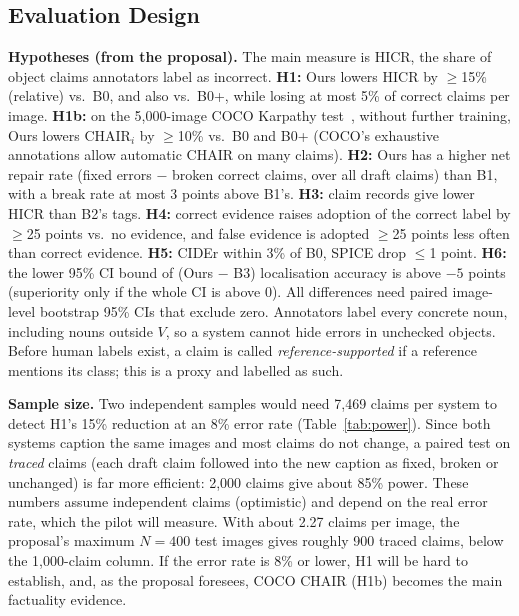 \documentclass[conference]{IEEEtran}
\begin{document}
\subsection{Evaluation Design}
\label{sec:eval}
\textbf{Hypotheses (from the proposal).} The main measure is HICR, the share of object claims annotators label
as incorrect. \textbf{H1:} Ours lowers HICR by $\ge$15\% (relative) vs.\ B0, and also vs.\ B0+, while losing at
most 5\% of correct claims per image. \textbf{H1b:} on the 5,000-image COCO Karpathy
test~\cite{karpathy2015deep,lin2014microsoft}, without further training, Ours lowers CHAIR$_i$
\cite{rohrbach2018object} by $\ge$10\% vs.\ B0 and B0+ (COCO's exhaustive annotations allow automatic CHAIR on
many claims). \textbf{H2:} Ours has a higher net repair rate (fixed errors $-$ broken correct claims, over all
draft claims) than B1, with a break rate at most 3 points above B1's. \textbf{H3:} claim records give lower
HICR than B2's tags. \textbf{H4:} correct evidence raises adoption of the correct label by $\ge$25 points vs.\
no evidence, and false evidence is adopted $\ge$25 points less often than correct evidence. \textbf{H5:} CIDEr
within 3\% of B0, SPICE drop $\le$1 point. \textbf{H6:} the lower 95\% CI bound of (Ours $-$ B3) localisation
accuracy is above $-5$ points (superiority only if the whole CI is above 0). All differences need paired
image-level bootstrap 95\% CIs that exclude zero. Annotators label every concrete noun, including nouns outside
$V$, so a system cannot hide errors in unchecked objects. Before human labels exist, a claim is called
\emph{reference-supported} if a reference mentions its class; this is a proxy and labelled as such.

\textbf{Sample size.} Two independent samples would need 7,469 claims per system to detect H1's 15\%
reduction at an 8\% error rate (Table~\ref{tab:power}). Since both systems caption the same images and most
claims do not change, a paired test on \emph{traced} claims (each draft claim followed into the new caption as
fixed, broken or unchanged) is far more efficient: 2,000 claims give about 85\% power. These numbers assume
independent claims (optimistic) and depend on the real error rate, which the pilot will measure. With about
2.27 claims per image, the proposal's maximum $N=400$ test images gives roughly 900 traced claims, below the
1,000-claim column. If the error rate is 8\% or lower, H1 will be hard to establish, and, as the proposal
foresees, COCO CHAIR (H1b) becomes the main factuality evidence.
\end{document}
